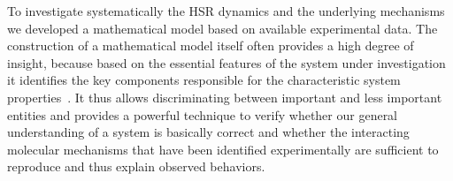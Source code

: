 \documentclass[oneside, 10pt, a4paper, twocolumn]{article}
\begin{document}
To investigate systematically the HSR dynamics and the underlying mechanisms we developed a mathematical model based on available experimental data. 
The construction of a mathematical model itself often provides a high degree of insight,
because based on the essential features of the system under investigation
it identifies the key components responsible for the characteristic
system properties~\cite{Pfau2011, Matuszynska2015}. It thus allows discriminating between important and less important entities
and provides a powerful technique to verify whether our general understanding of a system is
basically correct and whether the interacting molecular mechanisms that have been identified experimentally
are sufficient to reproduce and thus explain observed behaviors.
\end{document}
